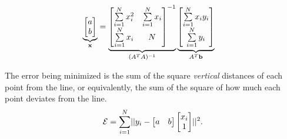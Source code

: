 \begin{problem}
\begin{enumroman}
\begin{answer}
        \begin{align*}
          \underbrace{\begin{bmatrix}
            a \\
            b
          \end{bmatrix}}_{\mathbf{x}}
          &=
          \underbrace{\begin{bmatrix}
            \sum\limits_{i=1}^N x_i^2 & \sum\limits_{i=1}^N x_i \\
            \sum\limits_{i=1}^N x_i & N
          \end{bmatrix}^{-1}}_{(A^T A)^{-1}}
          \underbrace{\begin{bmatrix}
            \sum\limits_{i=1}^N x_i y_i \\
            \sum\limits_{i=1}^N y_i
          \end{bmatrix}}_{A^T \mathbf{b}}
        \end{align*}

        The error being minimized is the sum of the square
        \emph{vertical} distances of each point from the line,
        or equivalently, the sum of the square of how much
        each point deviates from the line.
        \[ \mathcal{E} = \sum_{i=1}^N \lvert\lvert y_i - 
            \begin{bmatrix} a & b \end{bmatrix}
            \begin{bmatrix} x_i \\ 1 \end{bmatrix}\rvert
          \rvert^2. \]

        \begin{figure}[H]
          \centering
\end{figure}
\end{answer}
\end{enumroman}
\end{problem}

